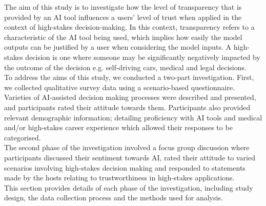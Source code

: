 \documentclass[manuscript,screen,review]{acmart}
\begin{document}
The aim of this study is to investigate how the level of transparency that is provided by an AI tool influences a users' level of trust when applied in the context of high-stakes decision-making. In this context, transparency refers to a characteristic of the AI tool being used, which implies how easily the model outputs can be justified by a user when considering the model inputs. A high-stakes decision is one where someone may be significantly negatively impacted by the outcome of the decision e.g. self-driving cars, medical and legal decisions.\\

To address the aims of this study, we conducted a two-part investigation. First, we collected qualitative survey data using a scenario-based questionnaire. Varieties of AI-assisted decision making processes were described and presented, and participants rated their attitude towards them. Participants also provided relevant demographic information; detailing proficiency with AI tools and medical and/or high-stakes career experience which allowed their responses to be categorised.\\

The second phase of the investigation involved a focus group discussion where participants discussed their sentiment towards AI, rated their attitude to varied scenarios involving high-stakes decision making and responded to statements made by the hosts relating to trustworthiness in high-stakes applications.\\

This section provides details of each phase of the investigation, including study design, the data collection process and the methods used for analysis.
\end{document}
